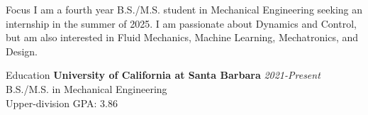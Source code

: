 \documentclass[
	11pt, %
]{resume} %
\begin{document}
\begin{rSection}{Focus}
	I am a fourth year B.S./M.S. student in Mechanical Engineering seeking an internship in the summer of 2025. 
	I am  passionate about Dynamics and Control, but am also interested in Fluid Mechanics, Machine Learning, Mechatronics, and Design.
\end{rSection}
\begin{rSection}{Education}	
	\textbf{University of California at Santa Barbara} \hfill \textit{2021-Present} \\ 
	B.S./M.S. in Mechanical Engineering \\
	Upper-division GPA: 3.86 \\
\end{rSection}

\end{document}
